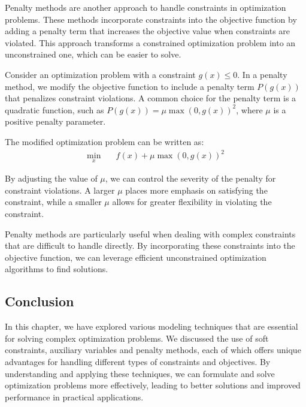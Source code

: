 Penalty methods are another approach to handle constraints in optimization problems.
These methods incorporate constraints into the objective function by adding a penalty term that increases the objective value when constraints are
violated.
This approach transforms a constrained optimization problem into an unconstrained one, which can be easier to solve.

Consider an optimization problem with a constraint \( g(x) \leq 0 \).
In a penalty method, we modify the objective function to include a penalty term \( P(g(x)) \) that penalizes constraint violations.
A common choice for the penalty term is a quadratic function, such as \( P(g(x)) = \mu \max(0, g(x))^2 \), where \( \mu \) is a positive penalty
parameter.

The modified optimization problem can be written as:
\begin{align*}
	\min_{x} \quad & f(x) + \mu \max(0, g(x))^2
\end{align*}

By adjusting the value of \( \mu \), we can control the severity of the penalty for constraint violations.
A larger \( \mu \) places more emphasis on satisfying the constraint, while a smaller \( \mu \) allows for greater flexibility in violating the
constraint.

Penalty methods are particularly useful when dealing with complex constraints that are difficult to handle directly.
By incorporating these constraints into the objective function, we can leverage efficient unconstrained optimization algorithms to find solutions.

\subsection{Conclusion}

In this chapter, we have explored various modeling techniques that are essential for solving complex optimization problems.
We discussed the use of soft constraints, auxiliary variables and penalty methods, each of which offers unique advantages for handling different
types of constraints and objectives.
By understanding and applying these techniques, we can formulate and solve optimization problems more effectively, leading to better solutions and
improved performance in practical applications.
